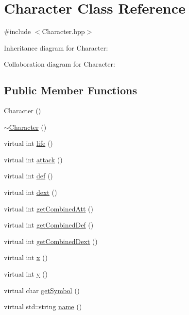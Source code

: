 \hypertarget{classCharacter}{\section{Character Class Reference}
\label{classCharacter}
}


{\ttfamily \#include $<$Character.\-hpp$>$}



Inheritance diagram for Character\-:


Collaboration diagram for Character\-:
\subsection*{Public Member Functions}
\begin{DoxyCompactItemize}
\item 
\hyperlink{classCharacter_adc27bdd255876169bad2ed0bae0cffb5}{Character} ()
\item 
\hyperlink{classCharacter_a9e9be564d05ded80962b2045aa70b3fc}{$\sim$\-Character} ()
\item 
virtual int \hyperlink{classCharacter_a6934d717d8b6ce2576becba198cadb5a}{life} ()
\item 
virtual int \hyperlink{classCharacter_a2366d0ed811cebbf48f47d6bc0662f3f}{attack} ()
\item 
virtual int \hyperlink{classCharacter_a974d3bf59cac8ae30c37fcf54f9ed629}{def} ()
\item 
virtual int \hyperlink{classCharacter_aea8031e9982513bf9009df8fbc777459}{dext} ()
\item 
virtual int \hyperlink{classCharacter_a2c1bc808a27d0082e3584a0d6f896028}{get\-Combined\-Att} ()
\item 
virtual int \hyperlink{classCharacter_ad1d09ebc955dd15aaff631607916e633}{get\-Combined\-Def} ()
\item 
virtual int \hyperlink{classCharacter_aea6698aa522f5dc45f08010653b144eb}{get\-Combined\-Dext} ()
\item 
virtual int \hyperlink{classCharacter_a172447a2db1010ed042dfdb6f8642f46}{x} ()
\item 
virtual int \hyperlink{classCharacter_aa1d691c246896b0131aefd51005a8341}{y} ()
\item 
virtual char \hyperlink{classCharacter_a82dba8b6f61c324d97968f7129fa96e7}{get\-Symbol} ()
\item 
virtual std\-::string \hyperlink{classCharacter_a843c88bf3324b8d9d482001abd159062}{name} ()
\item 

\end{DoxyCompactItemize}
